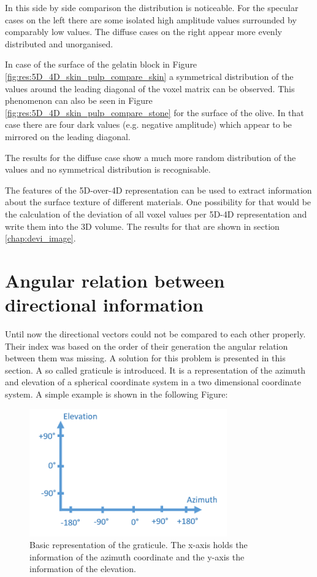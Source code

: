 In this side by side comparison the distribution is noticeable. For the specular cases on the left there are some isolated high amplitude values surrounded by comparably low values. The diffuse cases on the right appear more evenly distributed and unorganised. 

In case of the surface of the gelatin block in Figure \ref{fig:res:5D_4D_skin_pulp_compare_skin} a symmetrical distribution of the values around the leading diagonal of the voxel matrix can be observed. This phenomenon can also be seen in Figure \ref{fig:res:5D_4D_skin_pulp_compare_stone} for the surface of the olive. In that case there are four dark values (e.g. negative amplitude) which appear to be mirrored on the leading diagonal. 

The results for the diffuse case show a much more random distribution of the values and no symmetrical distribution is recognisable.


\bigskip

The features of the 5D-over-4D representation can be used to extract information about the surface texture of different materials. One possibility for that would be the calculation of the deviation of all voxel values per 5D-4D representation and write them into the 3D volume. The results for that are shown in section \ref{chap:devi_image}.





\newpage

\section{Angular relation between directional information}
\label{angular_directional_relation}


Until now the directional vectors could not be compared to each other properly. Their index was based on the order of their generation the angular relation between them was missing. A solution for this problem is presented in this section. A so called graticule is introduced. It is a representation of the azimuth and elevation of a spherical coordinate system in a two dimensional coordinate system. A simple example is shown in the following Figure:

\begin{figure}[H]
    \centering
    \includegraphics[width=0.76\textwidth]{Graphics/example_gradnetz.png}
    \caption{Basic representation of the graticule. The x-axis holds the information of the azimuth coordinate and the y-axis the information of the elevation. }
    \label{fig:gadnetz_example}
\end{figure}

